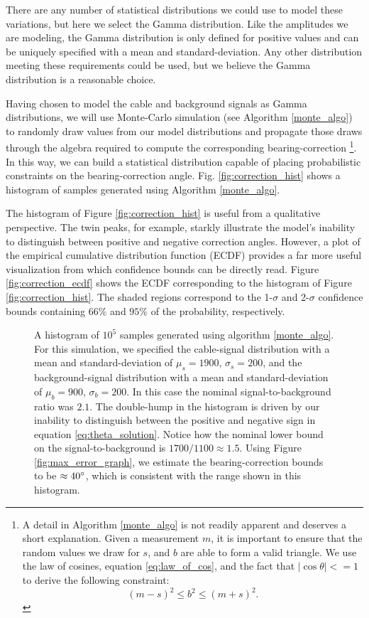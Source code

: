 \documentclass[paper=a4, fontsize=11pt]{scrartcl}
\numberwithin{equation}{section}		%
\numberwithin{figure}{section}			%
\numberwithin{table}{section}				%
\begin{document}
\begin{appendices}
There are any number of statistical distributions we could use to model these variations, but here we select the Gamma distribution.  Like the amplitudes we are modeling, the Gamma distribution is only defined for positive values and can be uniquely specified with a mean and standard-deviation.  Any other distribution meeting these requirements could be used, but we believe the Gamma distribution is a reasonable choice.

Having chosen to model the cable and background signals as Gamma distributions, we will use Monte-Carlo simulation (see Algorithm \ref{monte_algo}) to randomly draw values from our model distributions and propagate those draws through the algebra required to compute the corresponding bearing-correction
\footnote{
    A detail in Algorithm \ref{monte_algo} is not readily apparent and deserves a short explanation.  Given a measurement $m$, it is important to ensure that the random values we draw for $s$, and $b$ are able to form a valid triangle. We use the law of cosines, equation \ref{eq:law_of_cos},  and the fact that $\left|\cos\theta\right| <=1$ to derive the following constraint:
    \begin{equation} \label{eq:bounds}
          \left(m-s\right)^2 \leq b ^ 2 \leq \left(m + s\right)^2.  
    \end{equation}
    
}.
In this way, we can build a statistical distribution capable of placing probabilistic constraints on the bearing-correction angle.
Fig. \ref{fig:correction_hist} shows a histogram of samples generated using Algorithm \ref{monte_algo}.

The histogram of Figure \ref{fig:correction_hist} is useful from a qualitative perspective. The twin peaks, for example, starkly illustrate the model's inability to distinguish between positive and negative correction angles.  However, a plot of the empirical cumulative distribution function (ECDF) provides a far more useful visualization from which confidence bounds can be directly read. Figure \ref{fig:correction_ecdf} shows the ECDF corresponding to the histogram of Figure \ref{fig:correction_hist}.  The shaded regions correspond to the 1-$\sigma$ and 2-$\sigma$ confidence bounds containing $66\%$ and $95\%$ of the probability, respectively.


\begin{figure}[H]
  \caption{
  A histogram of $10^5$ samples generated using algorithm \ref{monte_algo}.  For this simulation, we specified the cable-signal distribution with a mean and standard-deviation of $\mu_s=1900$, $\sigma_s=200$, and the background-signal distribution with a mean and standard-deviation of $\mu_b=900$, $\sigma_b=200$.  In this case the nominal signal-to-background ratio was $2.1$.  The double-hump in the histogram is driven by our inability to distinguish between the positive and negative sign in equation \ref{eq:theta_solution}. Notice how the nominal lower bound on the signal-to-background is $1700/1100 \approx 1.5$.  Using Figure \ref{fig:max_error_graph}, we estimate the bearing-correction bounds to be $\approx40\degree$, which is consistent with the range shown in this histogram. 
  }


\end{figure}
\end{appendices}
\end{document}
